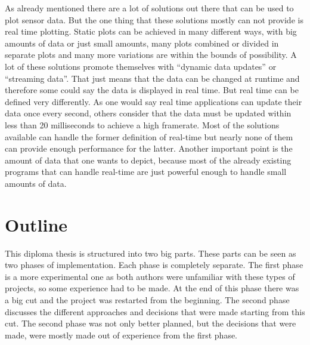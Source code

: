 As already mentioned there are a lot of solutions out there that can be used to plot sensor data. But the one thing that these solutions mostly can not provide is real time plotting. Static plots can be achieved in many different ways, with big amounts of data or just small amounts, many plots combined or divided in separate plots and many more variations are within the bounds of possibility. A lot of these solutions promote themselves with ``dynamic data updates'' or ``streaming data''. That just means that the data can be changed at runtime and therefore some could say the data is displayed in real time. But real time can be defined very differently. As one would say real time applications can update their data once every second, others consider that the data must be updated within less than 20 milliseconds to achieve a high framerate. Most of the solutions available can handle the former definition of real-time but nearly none of them can provide enough performance for the latter. Another important point is the amount of data that one wants to depict, because most of the already existing programs that can handle real-time are just powerful enough to handle small amounts of data.

\section{Outline}

This diploma thesis is structured into two big parts. These parts can be seen as two phases of implementation. Each phase is completely separate. The first phase is a more experimental one as both authors were unfamiliar with these types of projects, so some experience had to be made. At the end of this phase there was a big cut and the project was restarted from the beginning. The second phase discusses the different approaches and decisions that were made starting from this cut. The second phase was not only better planned, but the decisions that were made, were mostly made out of experience from the first phase.
